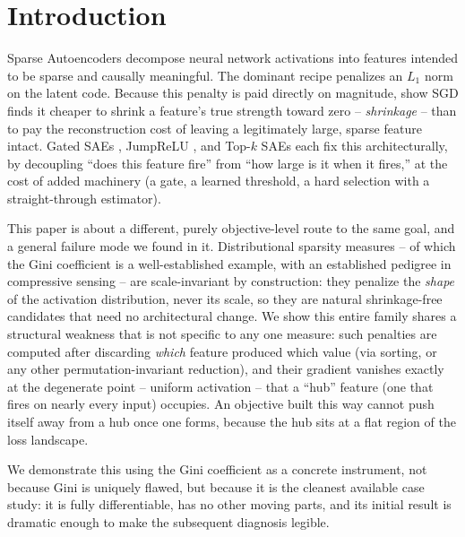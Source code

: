 \documentclass[11pt,twocolumn]{article}
\begin{document}
\section{Introduction}
Sparse Autoencoders decompose neural network activations into features intended to be sparse and causally meaningful. The dominant recipe penalizes an $L_1$ norm on the latent code. Because this penalty is paid directly on magnitude, \citet{wright2024addressing} show SGD finds it cheaper to shrink a feature's true strength toward zero -- \textit{shrinkage} -- than to pay the reconstruction cost of leaving a legitimately large, sparse feature intact. Gated SAEs \citep{lieberum2024gated}, JumpReLU \citep{rajamanoharan2024jumprelu}, and Top-$k$ SAEs \citep{gao2024topk} each fix this architecturally, by decoupling ``does this feature fire'' from ``how large is it when it fires,'' at the cost of added machinery (a gate, a learned threshold, a hard selection with a straight-through estimator).

This paper is about a different, purely objective-level route to the same goal, and a general failure mode we found in it. Distributional sparsity measures -- of which the Gini coefficient is a well-established example, with an established pedigree in compressive sensing \citep{hurley2009comparing, zonoobi2011gini} -- are scale-invariant by construction: they penalize the \emph{shape} of the activation distribution, never its scale, so they are natural shrinkage-free candidates that need no architectural change. We show this entire family shares a structural weakness that is not specific to any one measure: such penalties are computed after discarding \emph{which} feature produced which value (via sorting, or any other permutation-invariant reduction), and their gradient vanishes exactly at the degenerate point -- uniform activation -- that a ``hub'' feature (one that fires on nearly every input) occupies. An objective built this way cannot push itself away from a hub once one forms, because the hub sits at a flat region of the loss landscape.

We demonstrate this using the Gini coefficient as a concrete instrument, not because Gini is uniquely flawed, but because it is the cleanest available case study: it is fully differentiable, has no other moving parts, and its initial result is dramatic enough to make the subsequent diagnosis legible.
\end{document}
